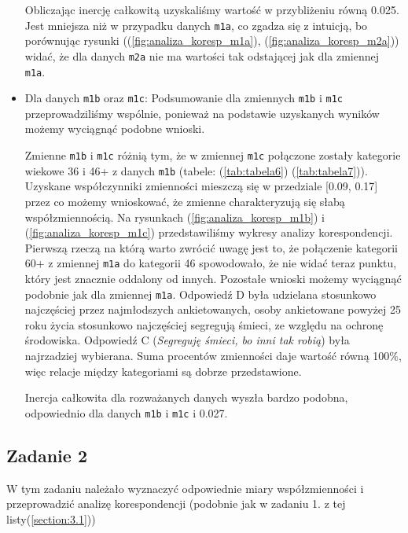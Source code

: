 \documentclass[12pt]{mwart}
\begin{document}
\begin{itemize}[label=$\bullet$]
		Obliczając inercję całkowitą uzyskaliśmy wartość w przybliżeniu równą 0.025. Jest mniejsza niż w przypadku danych \verb|m1a|, co zgadza się z intuicją, bo porównując rysunki ((\ref{fig:analiza_koresp_m1a}), (\ref{fig:analiza_koresp_m2a})) widać, że dla danych \verb|m2a| nie ma wartości tak odstającej jak dla zmiennej \verb|m1a|.
	\item Dla danych \verb|m1b| oraz \verb|m1c|:\newline
		Podsumowanie dla zmiennych \verb|m1b| i \verb|m1c| przeprowadziliśmy wspólnie, ponieważ na podstawie uzyskanych wyników możemy wyciągnąć podobne wnioski.
		
		Zmienne \verb|m1b| i \verb|m1c| różnią tym, że w zmiennej \verb|m1c| połączone zostały kategorie wiekowe 36  i 46+ z danych \verb|m1b| (tabele: (\ref{tab:tabela6}) (\ref{tab:tabela7})).\newline\noindent
		Uzyskane współczynniki zmienności mieszczą się w przedziale [0.09, 0.17] przez co możemy wnioskować, że zmienne charakteryzują się słabą współzmiennością.\newline\noindent
		Na rysunkach (\ref{fig:analiza_koresp_m1b}) i (\ref{fig:analiza_koresp_m1c}) przedstawiliśmy wykresy analizy korespondencji. Pierwszą rzeczą na którą warto zwrócić uwagę jest to, że połączenie kategorii 60+ z zmiennej \verb|m1a| do kategorii 46  spowodowało, że nie widać teraz punktu, który jest znacznie oddalony od innych. Pozostałe wnioski możemy wyciągnąć podobnie jak dla zmiennej \verb|m1a|. Odpowiedź D była udzielana stosunkowo najczęściej przez najmłodszych ankietowanych, osoby ankietowane powyżej 25 roku życia stosunkowo najczęściej segregują śmieci, ze względu na ochronę środowiska. Odpowiedź C (\emph{Segreguję śmieci, bo inni tak robią}) była najrzadziej wybierana.\newline\noindent
		Suma procentów zmienności daje wartość równą 100\%, więc relacje między kategoriami są dobrze przedstawione.
		
		Inercja całkowita dla rozważanych danych wyszła bardzo podobna, odpowiednio dla danych \verb|m1b| i \verb|m1c|  i 0.027.
\end{itemize}
\subsection{Zadanie 2}\label{section:3.2}
W tym zadaniu należało wyznaczyć odpowiednie miary współzmienności i przeprowadzić analizę korespondencji (podobnie jak w zadaniu 1. z tej listy\pauza(\ref{section:3.1}))
\end{document}
